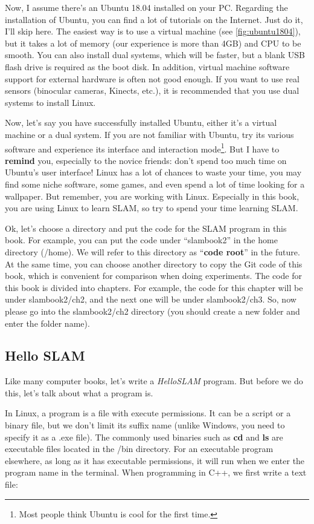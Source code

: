 Now, I assume there's an Ubuntu 18.04 installed on your PC. Regarding the installation of Ubuntu, you can find a lot of tutorials on the Internet. Just do it, I'll skip here. The easiest way is to use a virtual machine (see \autoref{fig:ubuntu1804}), but it takes a lot of memory (our experience is more than 4GB) and CPU to be smooth. You can also install dual systems, which will be faster, but a blank USB flash drive is required as the boot disk. In addition, virtual machine software support for external hardware is often not good enough. If you want to use real sensors (binocular cameras, Kinects, etc.), it is recommended that you use dual systems to install Linux.

Now, let's say you have successfully installed Ubuntu, either it's a virtual machine or a dual system. If you are not familiar with Ubuntu, try its various software and experience its interface and interaction mode\footnote{Most people think Ubuntu is cool for the first time. }. But I have to \textbf{remind} you, especially to the novice friends: don't spend too much time on Ubuntu's user interface! Linux has a lot of chances to waste your time, you may find some niche software, some games, and even spend a lot of time looking for a wallpaper. But remember, you are working with Linux. Especially in this book, you are using Linux to learn SLAM, so try to spend your time learning SLAM\@.

Ok, let's choose a directory and put the code for the SLAM program in this book. For example, you can put the code under ``slambook2'' in the home directory (/home). We will refer to this directory as ``\textbf{code root}'' in the future. At the same time, you can choose another directory to copy the Git code of this book, which is convenient for comparison when doing experiments. The code for this book is divided into chapters. For example, the code for this chapter will be under slambook2/ch2, and the next one will be under slambook2/ch3. So, now please go into the slambook2/ch2 directory (you should create a new folder and enter the folder name).

\subsection{Hello SLAM}
Like many computer books, let's write a \textit{HelloSLAM} program. But before we do this, let's talk about what a program is.

In Linux, a program is a file with execute permissions. It can be a script or a binary file, but we don't limit its suffix name (unlike Windows, you need to specify it as a .exe file). The commonly used binaries such as \textbf{cd} and \textbf{ls} are executable files located in the /bin directory. For an executable program elsewhere, as long as it has executable permissions, it will run when we enter the program name in the terminal. When programming in C++, we first write a text file:

